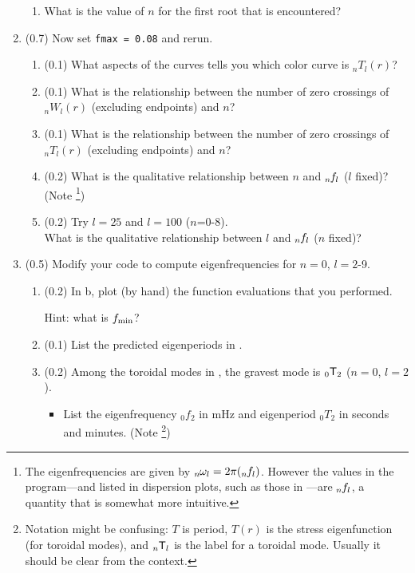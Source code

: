 \documentclass[11pt,titlepage,fleqn]{article}
\newcommand{\tnl}[2]{\mbox{$_{#1}\ssT_{#2}$}}
\newcommand{\Tnl}{\mbox{${}_nT_l$}}   %
\newcommand{\Wnl}{\mbox{${}_nW_l$}}   %
\newcommand{\omnl}{\mbox{${}_{n\hspace{-0.2 mm}}\omega_l$}}  %
\newcommand{\fnl}{\mbox{${}_{n\hspace{-0.2 mm}}f_l$}}        %
\begin{document}
\begin{enumerate}
\begin{enumerate}
\item What is the value of $n$ for the first root that is encountered?

\end{enumerate}


\item (0.7) Now set \verb+fmax = 0.08+ and rerun.
%
\begin{enumerate}
\item (0.1) What aspects of the curves tells you which color curve is $\Tnl(r)$?
\item (0.1) What is the relationship between the number of zero crossings of $\Wnl(r)$ (excluding endpoints) and $n$?
\item (0.1) What is the relationship between the number of zero crossings of $\Tnl(r)$ (excluding endpoints) and $n$?
\item (0.2) What is the qualitative relationship between $n$ and $\fnl$ ($l$ fixed)? (Note \footnote{The eigenfrequencies are given by $\omnl = 2\pi(\fnl)$. However the values in the program---and listed in dispersion plots, such as those in \citet{SteinWysession}---are $\fnl$, a quantity that is somewhat more intuitive.})
\item (0.2) Try $l=25$ and $l=100$ ($n$=0-8). \\
What is the qualitative relationship between $l$ and $\fnl$ ($n$ fixed)?
\end{enumerate}


\item (0.5) Modify your code to compute eigenfrequencies for $n=0$, $l=2$-9.
%
\begin{enumerate}
\item (0.2) In b, plot (by hand) the function evaluations that you performed.

Hint: what is $f_{\rm min}$?

\item (0.1) List the predicted eigenperiods in .

\item (0.2) Among the toroidal modes in , the gravest mode is \tnl{0}{2} ($n=0$, $l=2$).
%
\begin{itemize}
\item List the eigenfrequency $_0f_2$ in mHz and eigenperiod $_0T_2$ in seconds and minutes. (Note \footnote{Notation might be confusing: $T$ is period, $T(r)$ is the stress eigenfunction (for toroidal modes), and \tnl{n}{l} is the label for a toroidal mode. Usually it should be clear from the context.})


\end{itemize}
\end{enumerate}
\end{enumerate}
\end{document}
